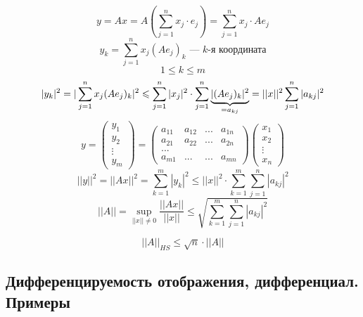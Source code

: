 \documentclass[main]{subfiles}
\begin{document}
	\begin{Proof}
		\[y = Ax = A(\sum_{j = 1}^n x_j \cdot e_j) = \sum^n_{j = 1} x_j \cdot Ae_j\]
		\[y_k = \sum^n_{j = 1}x_j(Ae_j)_k \text{ --- $k$-я координата}\]
		\[1 \leq k \leq m\]
		\[|y_k|^2 = |\sum^n_{j = 1} x_j (Ae_j)_k|^2 \leq \sum_{j = 1}^n |x_j|^2 \cdot
			\sum^n_{j=1} \ub{= a_{kj} }{|(Ae_j)_k|^2} = ||x||^2 \sum^n_{j = 1} |a_{kj}|^2\]
		\[y = \begin{pmatrix}
				y_1    \\
				y_2    \\
				\vdots \\
				y_m
			\end{pmatrix}
			= \begin{pmatrix}
				a_{11} & a_{12} & ... & a_{1n} \\
				a_{21} & a_{22} & ... & a_{2n} \\
				...                            \\
				a_{m1} & ...    & ... & a_{mn}
			\end{pmatrix}
			\begin{pmatrix}
				x_1    \\
				x_2    \\
				\vdots \\
				x_n
			\end{pmatrix}
		\]
		\[||y||^2 = ||Ax||^2 = \sum^m_{k = 1}|y_k|^2 \leq ||x||^2 \cdot \sum^m_{k = 1}\sum^n_{j = 1} |a_{kj}|^2\]
		\[||A|| = \sup_{||x|| \neq 0} \frac{||Ax||}{||x||} \leq \sqrt{\sum^m_{k = 1} \sum^n_{j = 1} |a_{kj}|^2}\]
	\end{Proof}

	\begin{Upr}
		\[||A||_{HS} \leq \sqrt{n} \cdot ||A||\]
	\end{Upr}

	\newpage
	\subsection{Дифференцируемость отображения, дифференциал. Примеры}
\end{document}
